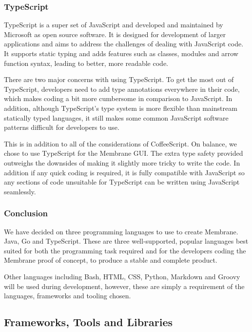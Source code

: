 \documentclass[11pt, a4paper, twocolumn, twoside]{report}
\begin{document}
\subsubsection{TypeScript}

TypeScript is a super set of JavaScript and developed and maintained by Microsoft as open source software. It is designed for development of larger applications and aims to address the challenges of dealing with JavaScript code. It supports static typing and adds features such as classes, modules and arrow function syntax, leading to better, more readable code. \citep{typescript2017site}

There are two major concerns with using TypeScript. To get the most out of TypeScript, developers need to add type annotations everywhere in their code, which makes coding a bit more cumbersome in comparison to JavaScript. In addition, although TypeScript's type system is more flexible than mainstream statically typed languages, it still makes some common JavaScript software patterns difficult for developers to use. \citep{dataart2017site}

This is in addition to all of the considerations of CoffeeScript. On balance, we chose to use TypeScript for the Membrane GUI. The extra type safety provided outweighs the downsides of making it slightly more tricky to write the code. In addition if any quick coding is required, it is fully compatible with JavaScript so any sections of code unsuitable for TypeScript can be written using JavaScript seamlessly.

\subsubsection{Conclusion}

We have decided on three programming languages to use to create Membrane. Java, Go and TypeScript. These are three well-supported, popular languages best suited for both the programming task required and for the developers coding the Membrane proof of concept, to produce a stable and complete product.

Other languages including Bash, HTML, CSS, Python, Markdown and Groovy will be used during development, however, these are simply a requirement of the languages, frameworks and tooling chosen.

\subsection{Frameworks, Tools and Libraries}
\end{document}
